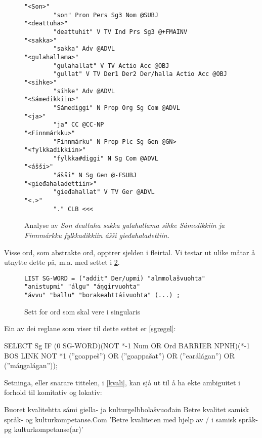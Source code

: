 \documentclass[a4paper,norsk]{article}
\begin{document}
\begin{figure}[htbp]
\begin{center}
\begin{verbatim}
"<Son>"
        "son" Pron Pers Sg3 Nom @SUBJ
"<deattuha>"
        "deattuhit" V TV Ind Prs Sg3 @+FMAINV
"<sakka>"
        "sakka" Adv @ADVL
"<gulahallama>"
        "gulahallat" V TV Actio Acc @OBJ
        "gullat" V TV Der1 Der2 Der/halla Actio Acc @OBJ
"<sihke>"
        "sihke" Adv @ADVL
"<Sámedikkiin>"
        "Sámediggi" N Prop Org Sg Com @ADVL
"<ja>"
        "ja" CC @CC-NP
"<Finnmárkku>"
        "Finnmárku" N Prop Plc Sg Gen @GN>
"<fylkkadikkiin>"
        "fylkka#diggi" N Sg Com @ADVL
"<ášši>"
        "ášši" N Sg Gen @-FSUBJ
"<gieđahaladettiin>"
        "gieđahallat" V TV Ger @ADVL
"<.>"
        "." CLB <<<
\end{verbatim}

\caption{Analyse av \textit{Son deattuha sakka gulahallama sihke Sámedikkiin ja Finnmárkku fylkkadikkiin ášši gieđahaladettiin.}}
\label{fylkeanalyse}
\end{center}
\end{figure}

Visse ord, som abstrakte ord, opptrer sjelden i fleirtal. Vi testar ut ulike måtar å utnytte dette på, m.a. med settet i \ref{sgwds}. %


\begin{figure}[htbp]
\begin{center}
\begin{verbatim}
LIST SG-WORD = ("addit" Der/upmi) "almmolašvuohta" "anistupmi" "álgu" "áŋgirvuohta" 
"ávvu" "ballu" "borakeahttáivuohta" (...) ;
\end{verbatim}
\caption{Sett for ord som skal vere i singularis}
\label{sgwds}
\end{center}
\end{figure}

Ein av dei reglane  som viser til dette settet er \ref{sgregel}: %

\begin{example}\label{sgregel}
SELECT Sg IF (0 SG-WORD)(NOT *-1 Num OR Ord BARRIER NPNH)(*-1 BOS LINK NOT *1 (''goappeš'') OR (''goappašat'') OR (''earálágan'') OR (''máŋgalágan''));
\end{example}

Setninga, eller snarare tittelen, i \ref{kvali}, kan sjå ut til å ha ekte ambiguitet i forhold til komitativ og lokativ: %

\begin{example}\label{kvali}
\gll Buoret kvalitehtta sámi giella- ja kulturgelbbolašvuođain
      Betre kvalitet samisk språk- og kulturkompetanse.Com
\glt 'Betre kvaliteten med hjelp av / i samisk språk- pg kulturkompetanse(ar)'
\glend
\end{example}
\end{document}
